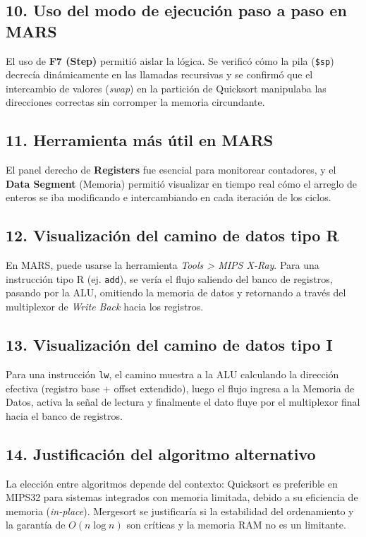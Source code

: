 \documentclass[12pt, a4paper]{article}
\begin{document}
\subsection{10. Uso del modo de ejecución paso a paso en MARS}
El uso de \textbf{F7 (Step)} permitió aislar la lógica. Se verificó cómo la pila (\texttt{\$sp}) decrecía dinámicamente en las llamadas recursivas y se confirmó que el intercambio de valores (\textit{swap}) en la partición de Quicksort manipulaba las direcciones correctas sin corromper la memoria circundante.

\subsection{11. Herramienta más útil en MARS}
El panel derecho de \textbf{Registers} fue esencial para monitorear contadores, y el \textbf{Data Segment} (Memoria) permitió visualizar en tiempo real cómo el arreglo de enteros se iba modificando e intercambiando en cada iteración de los ciclos.

\subsection{12. Visualización del camino de datos tipo R}
En MARS, puede usarse la herramienta \textit{Tools > MIPS X-Ray}. Para una instrucción tipo R (ej. \texttt{add}), se vería el flujo saliendo del banco de registros, pasando por la ALU, omitiendo la memoria de datos y retornando a través del multiplexor de \textit{Write Back} hacia los registros.

\subsection{13. Visualización del camino de datos tipo I}
Para una instrucción \texttt{lw}, el camino muestra a la ALU calculando la dirección efectiva (registro base + offset extendido), luego el flujo ingresa a la Memoria de Datos, activa la señal de lectura y finalmente el dato fluye por el multiplexor final hacia el banco de registros.

\subsection{14. Justificación del algoritmo alternativo}
La elección entre algoritmos depende del contexto: Quicksort es preferible en MIPS32 para sistemas integrados con memoria limitada, debido a su eficiencia de memoria (\textit{in-place}). Mergesort se justificaría si la estabilidad del ordenamiento y la garantía de $O(n \log n)$ son críticas y la memoria RAM no es un limitante.
\end{document}
